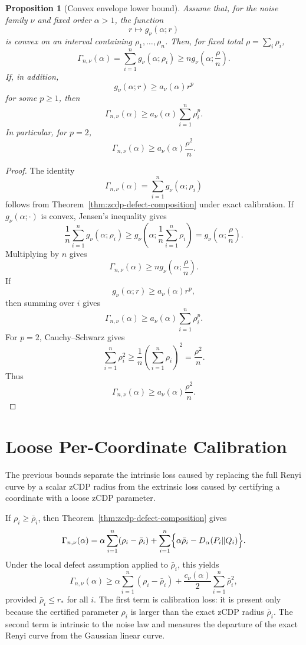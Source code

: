 \documentclass[11pt]{article}
\newtheorem{proposition}{Proposition}
\begin{document}
\begin{proposition}[Convex envelope lower bound]
\label{prop:convex-envelope}
Assume that, for the noise family \(\nu\) and fixed order \(\alpha>1\), the
function
\[
r\mapsto g_\nu(\alpha;r)
\]
is convex on an interval containing \(\rho_1,\dots,\rho_n\). Then, for fixed total
\(\rho=\sum_i\rho_i\),
\[
\Gamma_{n,\nu}(\alpha)
=
\sum_{i=1}^n g_\nu(\alpha;\rho_i)
\ge
n g_\nu\left(\alpha;\frac{\rho}{n}\right).
\]
If, in addition,
\[
g_\nu(\alpha;r)
\ge
 a_\nu(\alpha)r^p
\]
for some \(p\ge 1\), then
\[
\Gamma_{n,\nu}(\alpha)
\ge
 a_\nu(\alpha)
\sum_{i=1}^n \rho_i^p.
\]
In particular, for \(p=2\),
\[
\Gamma_{n,\nu}(\alpha)
\ge
 a_\nu(\alpha)\frac{\rho^2}{n}.
\]
\end{proposition}

\begin{proof}
The identity
\[
\Gamma_{n,\nu}(\alpha)=\sum_{i=1}^n g_\nu(\alpha;\rho_i)
\]
follows from Theorem~\ref{thm:zcdp-defect-composition} under exact calibration.
If \(g_\nu(\alpha;\cdot)\) is convex, Jensen's inequality gives
\[
\frac1n\sum_{i=1}^n g_\nu(\alpha;\rho_i)
\ge
 g_\nu\left(\alpha;\frac1n\sum_{i=1}^n \rho_i\right)
=
 g_\nu\left(\alpha;\frac{\rho}{n}\right).
\]
Multiplying by \(n\) gives
\[
\Gamma_{n,\nu}(\alpha)
\ge
n g_\nu\left(\alpha;\frac{\rho}{n}\right).
\]
If
\[
g_\nu(\alpha;r)
\ge
 a_\nu(\alpha)r^p,
\]
then summing over \(i\) gives
\[
\Gamma_{n,\nu}(\alpha)
\ge
 a_\nu(\alpha)\sum_{i=1}^n \rho_i^p.
\]
For \(p=2\), Cauchy--Schwarz gives
\[
\sum_{i=1}^n \rho_i^2
\ge
\frac1n\left(\sum_{i=1}^n \rho_i\right)^2
=
\frac{\rho^2}{n}.
\]
Thus
\[
\Gamma_{n,\nu}(\alpha)
\ge
 a_\nu(\alpha)\frac{\rho^2}{n}.
\]
\end{proof}

\section{Loose Per-Coordinate Calibration}

The previous bounds separate the intrinsic loss caused by replacing the full
Renyi curve by a scalar zCDP radius from the extrinsic loss caused by certifying a
coordinate with a loose zCDP parameter.

If \(\rho_i\ge \bar\rho_i\), then Theorem~\ref{thm:zcdp-defect-composition} gives
\[
\Gamma_{n,\nu}(\alpha)
=
\alpha\sum_{i=1}^n(\rho_i-\bar\rho_i)
+
\sum_{i=1}^n
\Bigl\{\alpha\bar\rho_i-D_\alpha(P_i\|Q_i)\Bigr\}.
\]
Under the local defect assumption applied to \(\bar\rho_i\), this yields
\[
\Gamma_{n,\nu}(\alpha)
\ge
\alpha\sum_{i=1}^n(\rho_i-\bar\rho_i)
+
\frac{c_\nu(\alpha)}{2}
\sum_{i=1}^n \bar\rho_i^2,
\]
provided \(\bar\rho_i\le r_*\) for all \(i\). The first term is calibration loss:
it is present only because the certified parameter \(\rho_i\) is larger than the
exact zCDP radius \(\bar\rho_i\). The second term is intrinsic to the noise law
and measures the departure of the exact Renyi curve from the Gaussian linear
curve.
\end{document}
